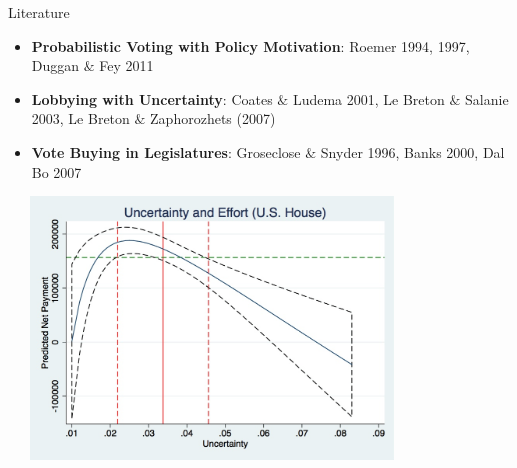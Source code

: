 \documentclass{beamer}
\begin{document}
\begin{frame}{Literature}
\pause
\begin{itemize}[<+->]
	\item \textbf{Probabilistic Voting with Policy Motivation}: Roemer 1994, 1997, Duggan $\&$ Fey 2011
	\item \textbf{Lobbying with Uncertainty}: Coates $\&$ Ludema 2001, Le Breton $\&$ Salanie 2003, Le Breton $\&$ Zaphorozhets (2007)
	\item \textbf{Vote Buying in Legislatures}: Groseclose $\&$ Snyder 1996, Banks 2000, Dal Bo 2007
\end{itemize}
\end{frame} 





\begin{frame}
\includegraphics[height=2.75in, width=4.25in]{graph1.jpg}
\end{frame}


\end{document}
